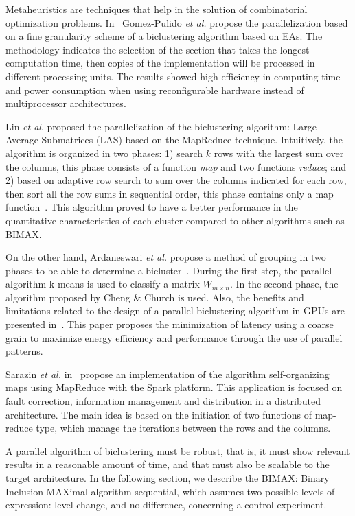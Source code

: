 \documentclass[a4paper,conference]{IEEEtran}
\begin{document}
Metaheuristics are techniques that help in the solution of combinatorial optimization problems. In~\cite{gomez2016fine} Gomez-Pulido \textit{et al.} propose the parallelization based on a fine granularity scheme of a biclustering algorithm based on EAs. The methodology indicates the selection of the section that takes the longest computation time, then copies of the implementation will be processed in different processing units. The results showed high efficiency in computing time and power consumption when using reconfigurable hardware instead of multiprocessor architectures.

Lin \textit{et al}. proposed the parallelization of the biclustering algorithm: Large Average Submatrices (LAS) based on the MapReduce technique. Intuitively, the algorithm is organized in two phases: 1) search $k$ rows with the largest sum over the columns, this phase consists of a function \textit{map} and two functions \textit{reduce}; and 2) based on adaptive row search to sum over the columns indicated for each row, then sort all the row sums in sequential order, this phase contains only a map function~\cite{lin2015parallel}. This algorithm proved to have a better performance in the quantitative characteristics of each cluster compared to other algorithms such as BIMAX.

On the other hand, Ardaneswari \textit{et al.} propose a method of grouping in two phases to be able to determine a bicluster~\cite{ardaneswari2017implementation}. During the first step, the parallel algorithm k-means is used to classify a matrix $ W_{m\times n}$. In the second phase, the algorithm proposed by Cheng \& Church is used. Also, the benefits and limitations related to the design of a parallel biclustering algorithm in GPUs are presented in~\cite{orzechowski2015effective}. This paper proposes the minimization of latency using a coarse grain to maximize energy efficiency and performance through the use of parallel patterns.

Sarazin \textit{et al.} in~\cite{sarazin2014biclustering} propose an implementation of the algorithm self-organizing maps using MapReduce with the Spark platform. This application is focused on fault correction, information management and distribution in a distributed architecture. The main idea is based on the initiation of two functions of map-reduce type, which manage the iterations between the rows and the columns.

A parallel algorithm of biclustering must be robust, that is, it must show relevant results in a reasonable amount of time, and that must also be scalable to the target architecture. In the following section, we describe the BIMAX: Binary Inclusion-MAXimal algorithm sequential, which assumes two possible levels of expression: level change, and no difference, concerning a control experiment.
\end{document}
